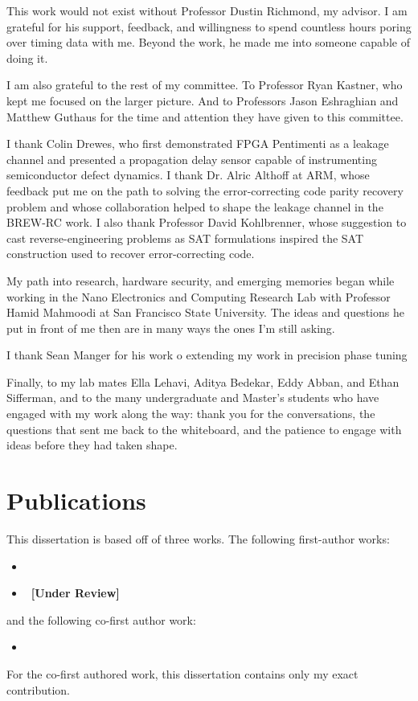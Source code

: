 This work would not exist without Professor Dustin Richmond, my advisor.
I am grateful for his support, feedback, and willingness to spend
countless hours poring over timing data with me. Beyond the work, he
made me into someone capable of doing it.

I am also grateful to the rest of my committee. To Professor Ryan
Kastner, who kept me focused on the larger picture. And to Professors
Jason Eshraghian and Matthew Guthaus for the time and attention they
have given to this committee.

I thank Colin Drewes, who first demonstrated FPGA Pentimenti as a
leakage channel and presented a propagation delay sensor capable of
instrumenting semiconductor defect dynamics. I thank Dr. Alric Althoff
at ARM, whose feedback put me on the path to solving the
error-correcting code parity recovery problem and whose collaboration
helped to shape the leakage channel in the BREW-RC work. I also thank
Professor David Kohlbrenner, whose suggestion to cast
reverse-engineering problems as SAT formulations inspired the SAT
construction used to recover error-correcting code.

My path into research, hardware security, and emerging memories began
while working in the Nano Electronics and Computing Research Lab with
Professor Hamid Mahmoodi at San Francisco State University. The ideas
and questions he put in front of me then are in many ways the ones I'm
still asking.

I thank Sean Manger for his work o extending my work in precision phase
tuning 

Finally, to my lab mates Ella Lehavi, Aditya Bedekar, Eddy Abban, and
Ethan Sifferman, and to the many undergraduate and Master's students who
have engaged with my work along the way: thank you for the
conversations, the questions that sent me back to the whiteboard, and
the patience to engage with ideas before they had taken shape.

\section{Publications}

This dissertation is based off of three works. The following
first-author works:
\begin{itemize}
	\item {}
	\item {}~\textbf{[Under Review]}
\end{itemize}
and the following co-first author work:
\begin{itemize}
	\item {}
\end{itemize}
For the co-first authored work, this dissertation contains only my exact
contribution.


